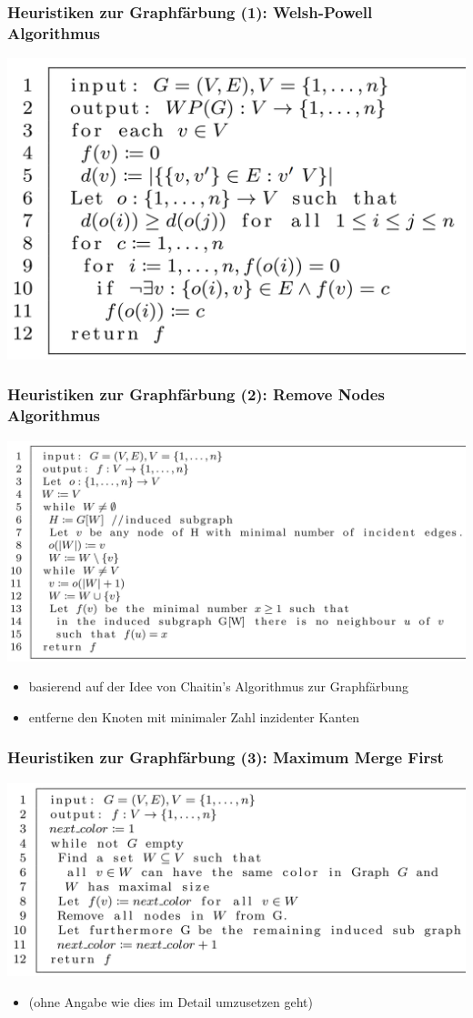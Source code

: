 \documentclass[onlymath]{beamer}
\begin{document}
\begin{frame}
	\frametitle{Heuristiken zur Graphfärbung (1): Welsh-Powell Algorithmus}
	\centering
	\includegraphics[scale=0.3]{wp.png}
\end{frame}

\begin{frame}
	\frametitle{Heuristiken zur Graphfärbung (2): Remove Nodes Algorithmus}
	\includegraphics[scale=0.18]{rn.png}
	\begin{itemize}
	\item basierend auf der Idee von Chaitin's Algorithmus zur Graphfärbung
	\item entferne den Knoten mit minimaler Zahl inzidenter Kanten
\end{itemize}
\end{frame}

\begin{frame}
	\frametitle{Heuristiken zur Graphfärbung (3): Maximum Merge First}
	\includegraphics[scale=0.2]{mmf.png}
	\begin{itemize}
		\item (ohne Angabe wie dies im Detail umzusetzen geht)
	\end{itemize}
\end{frame}
\end{document}
